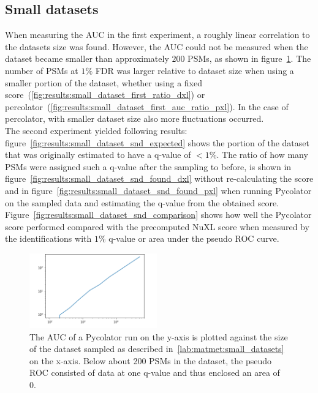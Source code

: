\subsection{Small datasets}
When measuring the AUC in the first experiment, a roughly linear correlation to the datasets size was found. However, the AUC could not be measured when the dataset became smaller than approximately $200$ PSMs, as shown in figure~\ref{fig:results:small_dataset_first_auc}. The number of PSMs at $1\%$ FDR was larger relative to dataset size when using a smaller portion of the dataset, whether using a fixed score~(\ref{fig:results:small_dataset_first_ratio_dxl}) or percolator~(\ref{fig:results:small_dataset_first_auc_ratio_pxl}). In the case of percolator, with smaller dataset size also more fluctuations occurred.\\
The second experiment yielded following results: figure~\ref{fig:results:small_dataset_snd_expected} shows the portion of the dataset that was originally estimated to have a q-value of $<1\%$. The ratio of how many PSMs were assigned such a q-value after the sampling to before, is shown in figure~\ref{fig:results:small_dataset_snd_found_dxl} without re-calculating the score and in figure~\ref{fig:results:small_dataset_snd_found_pxl} when running Pycolator on the sampled data and estimating the q-value from the obtained score. Figure~\ref{fig:results:small_dataset_snd_comparison} shows how well the Pycolator score performed compared with the precomputed NuXL score when measured by the identifications with $1\%$ q-value or area under the pseudo ROC curve.\\
\renewcommand{\baselinestretch}{0.9}
\begin{figure}
	\normalsize
	\centering
	\includegraphics[width = 0.49\textwidth]{figures/aucs_perc.png}
	\caption[Correlation between AUC and dataset size]{The AUC of a Pycolator run on the y-axis is plotted against the size of the dataset sampled as described in~\ref{lab:matmet:small_datasets} on the x-axis. Below about 200 PSMs in the dataset, the pseudo ROC consisted of data at one q-value and thus enclosed an area of 0.}
	\label{fig:results:small_dataset_first_auc}
\end{figure}
